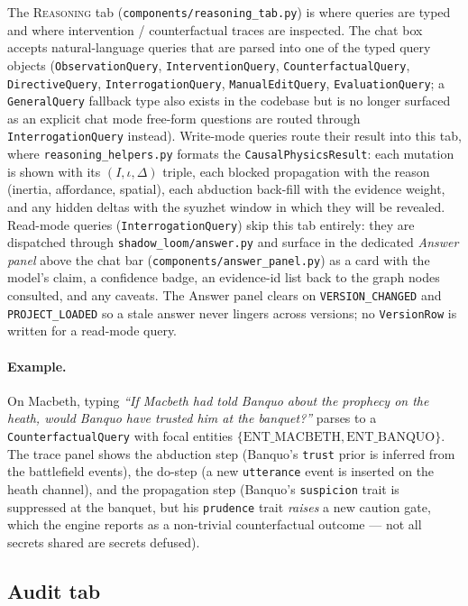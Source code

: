 \documentclass[11pt]{article}
\begin{document}
The \textsc{Reasoning} tab
(\texttt{components/reasoning\_tab.py}) is where queries are
typed and where intervention / counterfactual traces are
inspected. The chat box accepts natural-language queries that are
parsed into one of the typed query objects
(\texttt{ObservationQuery}, \texttt{InterventionQuery},
\texttt{CounterfactualQuery}, \texttt{DirectiveQuery},
\texttt{InterrogationQuery},
\texttt{ManualEditQuery}, \texttt{EvaluationQuery}; a
\texttt{GeneralQuery} fallback type also exists in the codebase
but is no longer surfaced as an explicit chat mode \textemdash{}
free-form questions are routed through
\texttt{InterrogationQuery} instead).
Write-mode queries route their result into this tab, where
\texttt{reasoning\_helpers.py} formats the
\texttt{CausalPhysicsResult}: each mutation is shown with its
$(I, \iota, \Delta)$ triple, each blocked propagation with the
reason (inertia, affordance, spatial), each abduction back-fill
with the evidence weight, and any hidden deltas with the
syuzhet window in which they will be revealed.
Read-mode queries (\texttt{InterrogationQuery}) skip this tab
entirely: they are dispatched
through \texttt{shadow\_loom/answer.py} and surface in the
dedicated \emph{Answer panel} above the chat bar
(\texttt{components/answer\_panel.py}) as a card with the model's
claim, a confidence badge, an evidence-id list back to the graph
nodes consulted, and any caveats. The Answer panel clears on
\texttt{VERSION\_CHANGED} and \texttt{PROJECT\_LOADED} so a stale
answer never lingers across versions; no \texttt{VersionRow} is
written for a read-mode query.

\paragraph{Example.} On Macbeth, typing \emph{``If Macbeth had
told Banquo about the prophecy on the heath, would Banquo have
trusted him at the banquet?''} parses to a
\texttt{CounterfactualQuery} with focal entities
$\{\text{ENT\_MACBETH}, \text{ENT\_BANQUO}\}$. The trace panel
shows the abduction step (Banquo's \texttt{trust} prior is
inferred from the battlefield events), the do-step (a new
\texttt{utterance} event is inserted on the heath channel), and
the propagation step (Banquo's \texttt{suspicion} trait is
suppressed at the banquet, but his \texttt{prudence} trait
\emph{raises} a new caution gate, which the engine reports as a
non-trivial counterfactual outcome --- not all secrets shared are
secrets defused).

\subsection{Audit tab}
\label{app:ui-audit}
\end{document}
